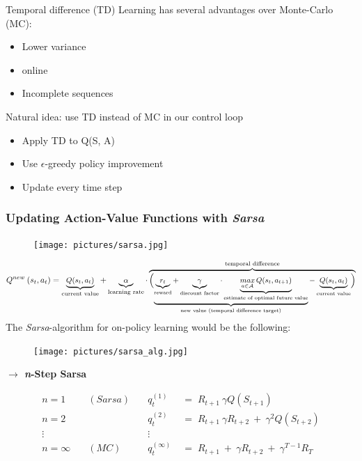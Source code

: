 \documentclass[10pt]{article}
\begin{document}
Temporal difference (TD) Learning has several advantages over Monte-Carlo (MC):
\begin{itemize}
\item Lower variance
\item online
\item Incomplete sequences
\end{itemize}
Natural idea: use TD instead of MC in our control loop
\begin{itemize}
\item Apply TD to Q(S, A)
\item Use $\epsilon$-greedy policy improvement
\item Update every time step
\end{itemize}
\newpage

\subsubsection*{Updating Action-Value Functions with \textit{Sarsa}}

\begin{figure}[h!]
\begin{center}
\texttt{[image: pictures/sarsa.jpg]}
\end{center}
\end{figure}
\begin{equation} \small
Q^{new}\:(s_{t}, a_{t})  = \underbrace{Q(s_{t}, a_{t})}_{\text{current value}}  + \underbrace{\alpha}_{\text{learning rate}} \cdot 
\overbrace{\Bigl( \underbrace{\underbrace{r_{t}}_{\text{reward}} + \underbrace{\gamma}_{\text{discount factor}} \cdot \underbrace{\mathop{max}_{a \in \mathcal{A}} Q(s_{t}, a_{t+1})}_{\text{estimate of optimal future value}}}_{\text{new value (temporal difference target)}} - \underbrace{Q(s_{t}, a_{t})}_{\text{current value}} \Bigr) }^{\text{temporal difference}}
\end{equation}
The \textit{Sarsa}-algorithm for on-policy learning would be the following:
\begin{figure}[h!]
\begin{center}
\texttt{[image: pictures/sarsa\_alg.jpg]}
\end{center}
\end{figure}

\textbf{$\rightarrow$ \textit{n}-Step Sarsa}

\begin{align*}
n=1 \quad & (Sarsa) \quad &q_{t}^{(1)} \; &= \; R_{t+1} \:  \gamma Q(S_{t+1}) \\
n=2 \quad & \quad \quad &q_{t}^{(2)} \; &= \; R_{t+1} \:  \gamma R_{t+2} \: + \: \gamma^{2} Q(S_{t+2}) \\
\vdots \quad &\quad \quad &\vdots & \\
n=\infty \quad & (MC) \quad &q_{t}^{(\infty)} \; &= \; R_{t+1} \: + \:  \gamma R_{t+2} \: + \: \gamma^{T-1} R_{T}
\end{align*}
\end{document}
